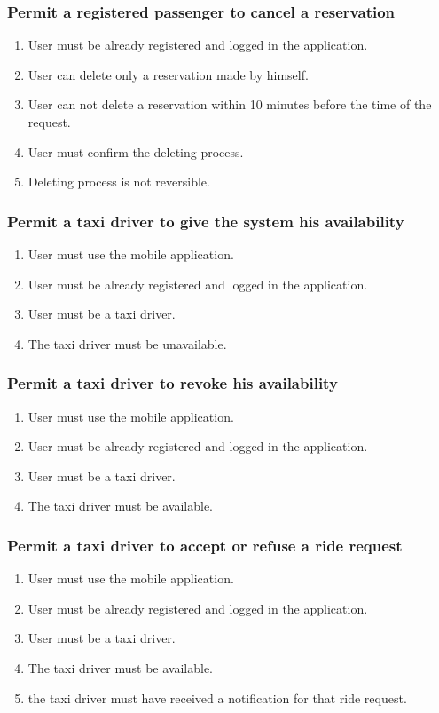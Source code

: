 		\subsubsection{Permit a registered passenger to cancel a reservation}
			\begin{enumerate}[label=\bfseries R\arabic*:]
				\item User must be already registered and logged in the application.
				\item User can delete only a reservation made by himself.
				\item User can not delete a reservation within 10 minutes before the time of the request.
				\item User must confirm the deleting process.
				\item Deleting process is not reversible.
			\end{enumerate}
		\subsubsection{Permit a taxi driver to give the system his availability}
			\begin{enumerate}[label=\bfseries R\arabic*:]
				\item User must use the mobile application.
				\item User must be already registered and logged in the application.
				\item User must be a taxi driver.
				\item The taxi driver must be unavailable.
			\end{enumerate}
		\subsubsection{Permit a taxi driver to revoke his availability}
			\begin{enumerate}[label=\bfseries R\arabic*:]
				\item User must use the mobile application.
				\item User must be already registered and logged in the application.
				\item User must be a taxi driver.
				\item The taxi driver must be available.
			\end{enumerate}
		\subsubsection{Permit a taxi driver to accept or refuse a ride request}
			\begin{enumerate}[label=\bfseries R\arabic*:]
				\item User must use the mobile application.
				\item User must be already registered and logged in the application.
				\item User must be a taxi driver.
				\item The taxi driver must be available.
				\item the taxi driver must have received a notification for that ride request.
			\end{enumerate}
